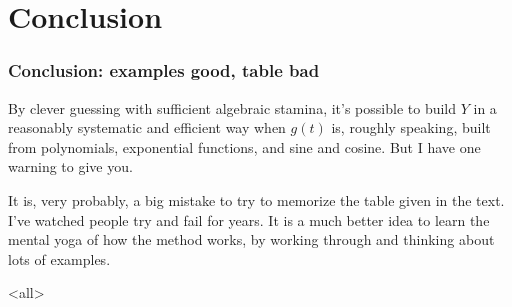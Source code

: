 \section{Conclusion}
\label{conclusion}

\begin{frame}

\frametitle{Conclusion: examples good, table bad}
\label{conclusion:examplesgoodtablebad}

By clever guessing with sufficient algebraic stamina, it's possible to build $ Y $ in a reasonably systematic and efficient way when $ g(t) $ is, roughly speaking, built from polynomials, exponential functions, and sine and cosine. But I have one warning to give you.
\pause

It is, very probably, a big mistake to try to memorize the table given in the text. I've watched people try and fail for years. It is a much better idea to learn the mental yoga of how the method works, by working through and thinking about lots of examples.

\end{frame}

\mode<all>


\mode*

